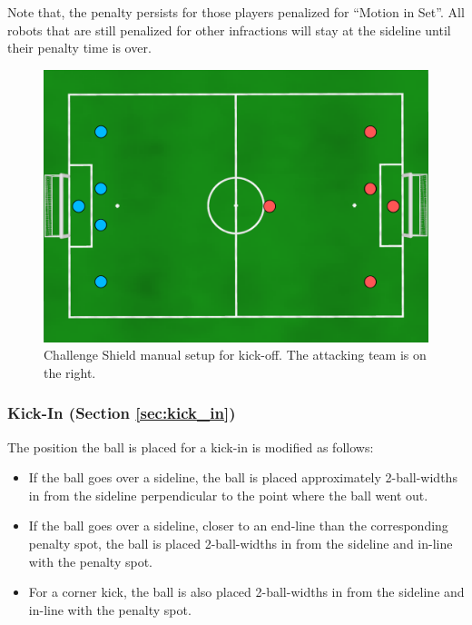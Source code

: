 Note that, the penalty persists for those players penalized for ``Motion in Set''. All robots that are still penalized for other infractions will stay at the sideline until their penalty time is over.

\begin{figure}[t]
\centerline{\includegraphics[width=\columnwidth]{figs/manual-placement-cs.pdf}}
\caption{Challenge Shield manual setup for kick-off.  The attacking team is on the right.}
\label{fig:ko-manual}
\end{figure}

%

\subsubsection{Kick-In (Section \ref{sec:kick_in})}

The position the ball is placed for a kick-in is modified as follows:
\begin{itemize}
    \item If the ball goes over a sideline, the ball is placed approximately 2-ball-widths in from the sideline perpendicular to the point where the ball went out.
    \item If the ball goes over a sideline, closer to an end-line than the corresponding penalty spot, the ball is placed 2-ball-widths in from the sideline and in-line with the penalty spot.
    \item For a corner kick, the ball is also placed 2-ball-widths in from the sideline and in-line with the penalty spot.
\end{itemize}

